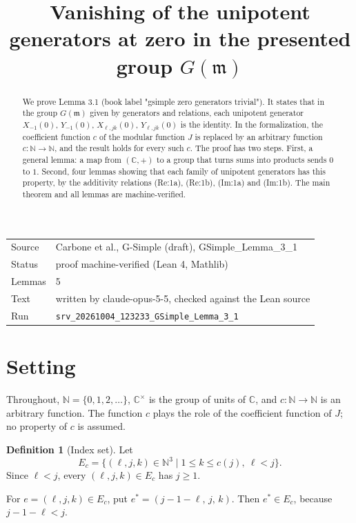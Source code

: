 \documentclass[11pt]{article}
\title{Vanishing of the unipotent generators at zero in the presented group $G(\mathfrak{m})$}
\date{}
\theoremstyle{definition}
\newtheorem{definition}[theorem]{Definition}
\theoremstyle{remark}
\begin{document}
\maketitle
\begin{abstract}
We prove Lemma 3.1 (book label "gsimple zero generators trivial"). It states that in the group $G(\mathfrak{m})$ given by generators and relations, each unipotent generator $X_{-1}(0)$, $Y_{-1}(0)$, $X_{\ell,jk}(0)$, $Y_{\ell,jk}(0)$ is the identity. In the formalization, the coefficient function $c$ of the modular function $J$ is replaced by an arbitrary function $c\colon\mathbb{N}\to\mathbb{N}$, and the result holds for every such $c$. The proof has two steps. First, a general lemma: a map from $(\mathbb{C},+)$ to a group that turns sums into products sends $0$ to $1$. Second, four lemmas showing that each family of unipotent generators has this property, by the additivity relations (Re:1a), (Re:1b), (Im:1a) and (Im:1b). The main theorem and all lemmas are machine-verified.
\end{abstract}

\begin{center}\small
\begin{tabular}{@{}ll@{}}
\toprule
Source & Carbone et al., G-Simple (draft), GSimple\_Lemma\_3\_1 \\
Status & proof machine-verified (Lean 4, Mathlib) \\
Lemmas & 5 \\
Text & written by claude-opus-5-5, checked against the Lean source \\
Run & \texttt{srv\_20261004\_123233\_GSimple\_Lemma\_3\_1} \\
\bottomrule
\end{tabular}
\end{center}

\tableofcontents

\section{Setting}

Throughout, $\mathbb{N}=\{0,1,2,\dots\}$, $\mathbb{C}^\times$ is the group of units of $\mathbb{C}$, and $c\colon \mathbb{N}\to\mathbb{N}$ is an arbitrary function. The function $c$ plays the role of the coefficient function of $J$; no property of $c$ is assumed.

\begin{definition}[Index set]
Let
\[
E_c=\{(\ell,j,k)\in\mathbb{N}^3 \mid 1\le k\le c(j),\ \ell<j\}.
\]
Since $\ell<j$, every $(\ell,j,k)\in E_c$ has $j\ge 1$.

For $e=(\ell,j,k)\in E_c$, put $e^{\ast}=(j-1-\ell,\,j,\,k)$. Then $e^{\ast}\in E_c$, because $j-1-\ell<j$.
\end{definition}
\end{document}
